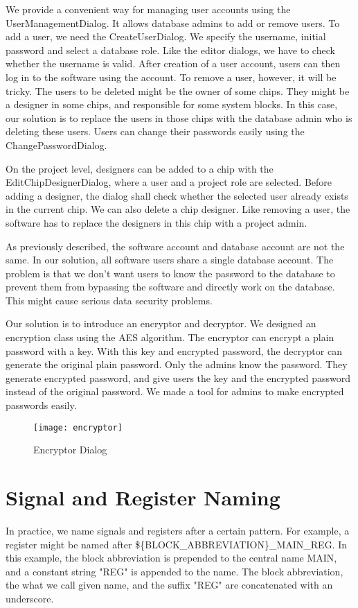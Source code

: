 We provide a convenient way for managing user accounts using the UserManagementDialog. It allows database admins to add or remove users. To add a user, we need the CreateUserDialog. We specify the username, initial password and select a database role. Like the editor dialogs, we have to check whether the username is valid. After creation of a user account, users can then log in to the software using the account. To remove a user, however, it will be tricky. The users to be deleted might be the owner of some chips. They might be a designer in some chips, and responsible for some system blocks. In this case, our solution is to replace the users in those chips with the database admin who is deleting these users. Users can change their passwords easily using the ChangePasswordDialog.

On the project level, designers can be added to a chip with the EditChipDesignerDialog, where a user and a project role are selected. Before adding a designer, the dialog shall check whether the selected user already exists in the current chip. We can also delete a chip designer. Like removing a user, the software has to replace the designers in this chip with a project admin.

As previously described, the software account and database account are not the same. In our solution, all software users share a single database account. The problem is that we don't want users to know the password to the database to prevent them from bypassing the software and directly work on the database. This might cause serious data security problems.

Our solution is to introduce an encryptor and decryptor. We designed an encryption class using the AES algorithm. The encryptor can encrypt a plain password with a key. With this key and encrypted password, the decryptor can generate the original plain password. Only the admins know the password. They generate encrypted password, and give users the key and the encrypted password instead of the original password. We made a tool for admins to make encrypted passwords easily.

\begin{figure}[htbp]
\centering
\texttt{[image: encryptor]}
\caption{Encryptor Dialog\label{fig:Encryptor Dialog}}
\end{figure} 

\section{Signal and Register Naming}
In practice, we name signals and registers after a certain pattern. For example, a register might be named after \$\{BLOCK\_ABBREVIATION\}\_MAIN\_REG. In this example, the block abbreviation is prepended to the central name MAIN, and a constant string "REG" is appended to the name. The block abbreviation, the what we call given name, and the suffix "REG" are concatenated with an underscore.

